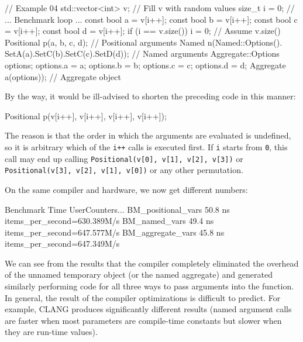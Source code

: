 \begin{code}
// Example 04
std::vector<int> v; // Fill v with random values
size_t i = 0;
// ... Benchmark loop ...
const bool a = v[i++];
const bool b = v[i++];
const bool c = v[i++];
const bool d = v[i++];
if (i == v.size()) i = 0; // Assume v.size() %
Positional p(a, b, c, d); // Positional arguments
Named n(Named::Options().
  SetA(a).SetC(b).SetC(c).SetD(d)); // Named arguments
Aggregate::Options options;
options.a = a;
options.b = b;
options.c = c;
options.d = d;
Aggregate a(options)); // Aggregate object
\end{code}

By the way, it would be ill-advised to shorten the preceding code in this manner:

\begin{code}
Positional p(v[i++], v[i++], v[i++], v[i++]);
\end{code}

The reason is that the order in which the arguments are evaluated is undefined, so it is arbitrary which of the \texttt{i++} calls is executed first. If \texttt{i} starts from \texttt{0}, this call may end up calling \texttt{Positional(v{[}0{]},\ v{[}1{]},\ v{[}2{]},\ v{[}3{]})} or \texttt{Positional(v{[}3{]},\ v{[}2{]},\ v{[}1{]},\ v{[}0{]})} or any other permutation.

On the same compiler and hardware, we now get different numbers:

\begin{code}
Benchmark                 Time  UserCounters...
BM_positional_vars     50.8 ns  items_per_second=630.389M/s
BM_named_vars          49.4 ns  items_per_second=647.577M/s
BM_aggregate_vars      45.8 ns  items_per_second=647.349M/s
\end{code}

We can see from the results that the compiler completely eliminated the overhead of the unnamed temporary object (or the named aggregate) and generated similarly performing code for all three ways to pass arguments into the function. In general, the result of the compiler optimizations is difficult to predict. For example, CLANG produces significantly different results (named argument calls are faster when most parameters are compile-time constants but slower when they are run-time values).

